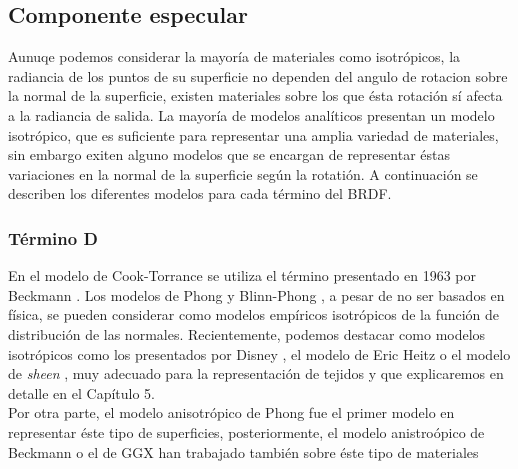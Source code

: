     \subsection{Componente especular}
    Aunuqe podemos considerar la mayor\'ia de materiales como isotr\'opicos, la radiancia de los puntos de su superficie no dependen
    del angulo de rotacion sobre la normal de la superficie, existen materiales sobre los que \'esta rotaci\'on s\'i afecta
    a la radiancia de salida. La mayor\'ia de modelos anal\'iticos presentan un modelo isotr\'opico, que es suficiente para
    representar una amplia variedad de materiales, sin embargo exiten alguno modelos que se encargan de representar \'estas
    variaciones en la normal de la superficie seg\'un la rotati\'on. A continuaci\'on se describen los diferentes modelos
    para cada t\'ermino del BRDF.


        \subsubsection*{T\'ermino D}

            En el modelo de Cook-Torrance \autocite{cooktorrance} se utiliza el t\'ermino presentado en 1963 por Beckmann \autocite{beckmann}.
            Los modelos de Phong \autocite{phong} y Blinn-Phong \autocite{blinnphong}, a pesar de no ser basados en f\'isica, se pueden considerar
            como modelos emp\'iricos isotr\'opicos de la funci\'on de distribuci\'on de las normales.
            Recientemente, podemos destacar como modelos isotr\'opicos como los presentados por Disney \autocite{disney12}, el modelo
            de Eric Heitz \autocite{ggx} o el modelo de \textit{sheen} \autocite{sheenbrdf}, muy adecuado para la representaci\'on de tejidos
            y que explicaremos en detalle en el Cap\'itulo 5.\\
            \hspace*{1.5em}Por otra parte, el modelo anisotr\'opico de Phong \autocite{anisotropicphong} fue el primer modelo en representar
            \'este tipo de superficies, posteriormente, el modelo anistro\'opico de Beckmann \autocite{beckmannspinozo} o el de
            GGX \autocite{anisotropicggx} han trabajado tambi\'en sobre \'este tipo de materiales


